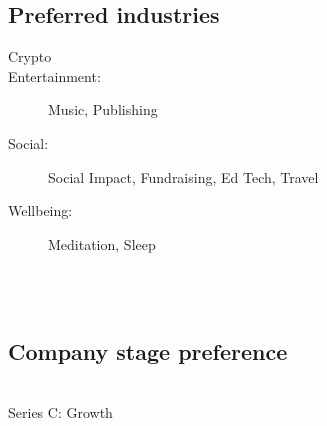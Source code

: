 {{\subsection*{Preferred industries
}
\begin{description}
 \item[Crypto]
\item[Entertainment:] Music, Publishing %
\item[Social:] Social Impact, Fundraising, Ed Tech, Travel %
\item[Wellbeing:] Meditation, Sleep %
\end{description}
\\ \\
\subsection*{Company stage preference}     \\
Series C: Growth \\




    }%
}
